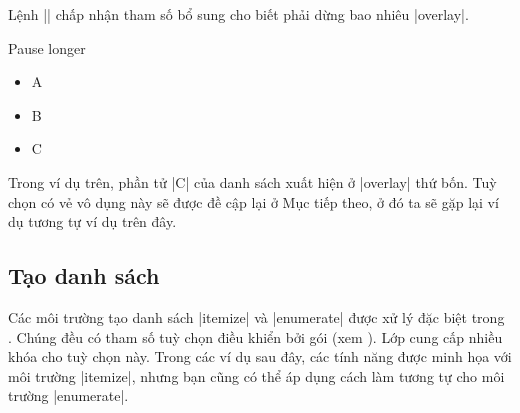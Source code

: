 Lệnh |\pause| chấp nhận tham số bổ sung cho biết phải dừng bao nhiêu |overlay|.
\begin{example}
 \begin{slide}{Pause longer}
   \begin{itemize}
     \item A \pause
     \item B \pause[2]
     \item C
   \end{itemize}
 \end{slide}
\end{example}
Trong ví dụ trên, phần tử |C| của danh sách xuất hiện ở |overlay|
thứ bốn. Tuỳ chọn có vẻ vô dụng này sẽ được đề cập lại ở Mục tiếp theo,
ở đó ta sẽ gặp lại ví dụ tương tự ví dụ trên đây.


\subsection{\texorpdfstring{Tạo danh sách}{Tao danh sach}}

\label{sec:lists}

Các môi trường tạo danh sách |itemize| và |enumerate| được xử lý
đặc biệt trong . Chúng đều có tham số tuỳ chọn điều khiển
bởi gói  (xem \cite{enumitem}). Lớp  cung
cấp nhiều khóa cho tuỳ chọn này. Trong các ví dụ sau đây, các tính năng
được minh họa với môi trường |itemize|, nhưng bạn cũng có thể áp dụng
cách làm tương tự cho môi trường |enumerate|.

